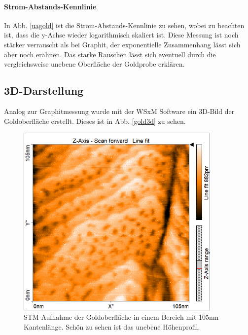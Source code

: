 \paragraph{Strom-Abstands-Kennlinie}
In Abb. \ref{uagold} ist die Strom-Abstands-Kennlinie zu sehen, wobei zu beachten ist, dass die y-Achse wieder logarithmisch skaliert ist. Diese Messung ist noch stärker verrauscht als bei Graphit, der exponentielle Zusammenhang lässt sich aber noch erahnen. Das starke Rauschen lässt sich eventuell durch die vergleichsweise  unebene Oberfläche der Goldprobe erklären.

\subsection{3D-Darstellung}
Analog zur Graphitmessung wurde mit der WSxM Software ein 3D-Bild der Goldoberfläche erstellt. Dieses ist in Abb. \ref{gold3d} zu sehen.

\begin{figure}[H]
	\begin{center}
	\includegraphics[width=10cm]{Mess/gold_oberfl.png}
	\caption{STM-Aufnahme der Goldoberfläche in einem Bereich mit 105nm Kantenlänge. Schön zu sehen ist das unebene Höhenprofil.}
	\label{gold_oberfl}
\end{center}
\end{figure}

